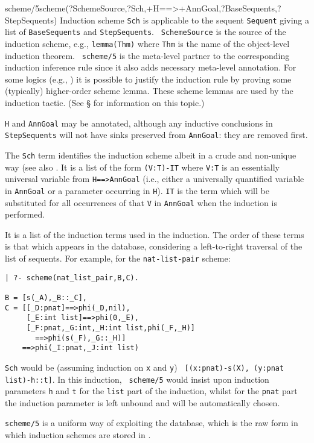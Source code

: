   
\begin{predicate}{scheme/5}{scheme(?SchemeSource,?Sch,+H==>+AnnGoal,?BaseSequents,?StepSequents)}%
Induction scheme {\tt Sch} is applicable to the sequent {\tt Sequent}
giving a list of {\tt BaseSequents} and {\tt StepSequents}.  {\tt
SchemeSource} is the source of the induction scheme, e.g.,
{\tt lemma(Thm)} where {\tt Thm} is the name of the object-level induction
theorem.  {\tt
scheme/5} is the meta-level partner to the corresponding induction
inference rule since it also adds necessary meta-level annotation.
For some logics (e.g., \oyster) it is possible to justify the induction
rule by proving some (typically) higher-order scheme lemma.  These
scheme lemmas are used by the induction tactic. (See
\S{} for information on this topic.)

{\tt H} and {\tt AnnGoal} may be annotated, although any inductive
conclusions in {\tt StepSequents} will not have sinks preserved from
{\tt AnnGoal}: they are removed first.

The {\tt Sch} term identifies the induction scheme albeit in a crude
and non-unique way (see also .  It is a list of the form
{\tt (V:T)-IT} where {\tt V:T} is an essentially universal variable
from {\tt H==>AnnGoal} (i.e., either a universally quantified variable
in {\tt AnnGoal} or a parameter occurring in {\tt H}).  {\tt IT} is
the term which will be substituted for all occurrences of that {\tt V}
in {\tt AnnGoal} when the induction is performed.

It is a list of the induction terms used in the induction. The order
of these terms is that which appears in the  database,
considering a left-to-right traversal of the list of sequents.  For
example, for the {\tt nat-list-pair} scheme:
\begin{verbatim}
| ?- scheme(nat_list_pair,B,C).

B = [s(_A),_B::_C],
C = [[_D:pnat]==>phi(_D,nil),
     [_E:int list]==>phi(0,_E),
     [_F:pnat,_G:int,_H:int list,phi(_F,_H)]
       ==>phi(s(_F),_G::_H)]
    ==>phi(_I:pnat,_J:int list)
\end{verbatim}
{\tt Sch} would be (assuming induction on {\tt x} and {\tt y}) {\tt
[(x:pnat)-s(X), (y:pnat list)-h::t]}.  In this induction, {\tt
scheme/5} would insist upon induction parameters {\tt h} and {\tt t}
for the {\tt list} part of the induction, whilst for the {\tt pnat}
part the induction parameter is left unbound and will be automatically
chosen. 

{\tt scheme/5} is a uniform way of exploiting the 
database, which is the raw form in which induction schemes are stored
in \clam.


\end{predicate}
